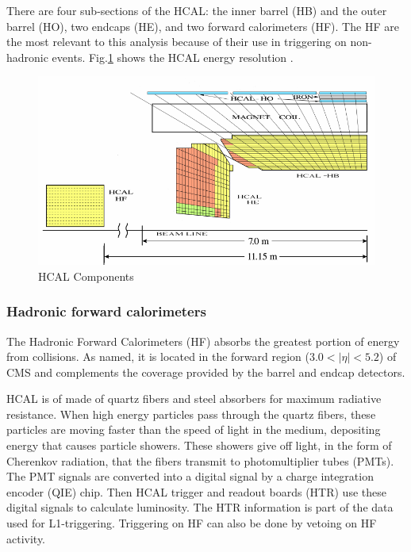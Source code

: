 There are four sub-sections of the HCAL: the inner barrel (HB) and the outer barrel (HO), two endcaps (HE), and two forward calorimeters (HF). The HF are the most relevant to this analysis because of their use in triggering on non-hadronic events. Fig.\ref{fig:hcalComp} shows the HCAL energy resolution \cite{Bayatian:2006nff}.

\begin{figure}[]
\begin{centering}
\includegraphics[width=5in]{Chapter3/importfigs/filtering_noise_in_CMS_hadron_calorimeter.png}
\par\end{centering}
\caption{HCAL Components \cite{Bayatian:2006nff} \label{fig:hcalComp}}
\end{figure}


\subsubsection{Hadronic forward calorimeters}

The Hadronic Forward Calorimeters (HF) absorbs the greatest portion of energy from collisions. As named, it is located in the forward region ($3.0<|\eta| < 5.2 $) of CMS and complements the coverage provided by the barrel and endcap detectors.

HCAL is of made of quartz fibers and steel absorbers for maximum radiative resistance. When high energy particles pass through the quartz fibers, these particles are moving faster than the speed of light in the medium, depositing energy that causes particle showers. These showers give off light, in the form of Cherenkov radiation, that the fibers transmit to photomultiplier tubes (PMTs). The PMT signals are converted into a digital signal by a charge integration encoder (QIE) chip. Then HCAL trigger and readout boards (HTR) use these digital signals to calculate luminosity. The HTR information is part of the data used for L1-triggering. Triggering on HF can also be done by vetoing on HF activity. 


